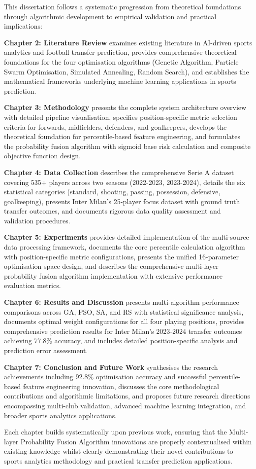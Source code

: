 This dissertation follows a systematic progression from theoretical foundations through algorithmic development to empirical validation and practical implications:

\textbf{Chapter 2: Literature Review} examines existing literature in AI-driven sports analytics and football transfer prediction, provides comprehensive theoretical foundations for the four optimisation algorithms (Genetic Algorithm, Particle Swarm Optimisation, Simulated Annealing, Random Search), and establishes the mathematical frameworks underlying machine learning applications in sports prediction.

\textbf{Chapter 3: Methodology} presents the complete system architecture overview with detailed pipeline visualisation, specifies position-specific metric selection criteria for forwards, midfielders, defenders, and goalkeepers, develops the theoretical foundation for percentile-based feature engineering, and formulates the probability fusion algorithm with sigmoid base risk calculation and composite objective function design.

\textbf{Chapter 4: Data Collection} describes the comprehensive Serie A dataset covering 535+ players across two seasons (2022-2023, 2023-2024), details the six statistical categories (standard, shooting, passing, possession, defensive, goalkeeping), presents Inter Milan's 25-player focus dataset with ground truth transfer outcomes, and documents rigorous data quality assessment and validation procedures.

\textbf{Chapter 5: Experiments} provides detailed implementation of the multi-source data processing framework, documents the core percentile calculation algorithm with position-specific metric configurations, presents the unified 16-parameter optimisation space design, and describes the comprehensive multi-layer probability fusion algorithm implementation with extensive performance evaluation metrics.

\textbf{Chapter 6: Results and Discussion} presents multi-algorithm performance comparisons across GA, PSO, SA, and RS with statistical significance analysis, documents optimal weight configurations for all four playing positions, provides comprehensive prediction results for Inter Milan's 2023-2024 transfer outcomes achieving 77.8\% accuracy, and includes detailed position-specific analysis and prediction error assessment.

\textbf{Chapter 7: Conclusion and Future Work} synthesises the research achievements including 92.8\% optimisation accuracy and successful percentile-based feature engineering innovation, discusses the core methodological contributions and algorithmic limitations, and proposes future research directions encompassing multi-club validation, advanced machine learning integration, and broader sports analytics applications.

Each chapter builds systematically upon previous work, ensuring that the Multi-layer Probability Fusion Algorithm innovations are properly contextualised within existing knowledge whilst clearly demonstrating their novel contributions to sports analytics methodology and practical transfer prediction applications.